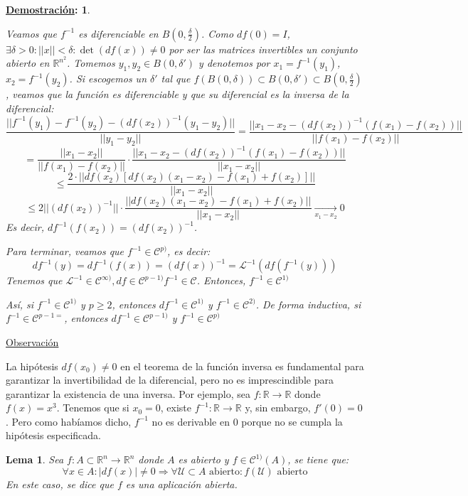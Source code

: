 \documentclass[10pt,a4paper,openright]{book}
\theoremstyle{break}
\newtheorem*{lema}{Lema}
\newtheorem*{demo}{\underline{Demostración}:}
\begin{document}
\begin{demo}
\begin{itemize}
Veamos que $f^{-1}$ es diferenciable en $B(0, \frac{\delta}{2})$. Como $df(0) = I$, $\exists \delta > 0 : || x || < \delta : \det(df(x)) \neq 0$ por ser las matrices invertibles un conjunto abierto en $\mathbb{R}^{n^2}$. Tomemos $y_1, y_2 \in B(0, \delta')$ y denotemos por $x_1 = f^{-1} (y_1)$, $x_2 = f^{-1}(y_2)$. Si escogemos un $\delta'$ tal que $f(B(0, \delta)) \subset B(0, \delta') \subset B(0, \frac{\delta}{2})$, veamos que la función es diferenciable y que su diferencial es la inversa de la diferencial:
$$\frac{||f^{-1}(y_1) - f^{-1}(y_2) - \left( df(x_2) \right)^{-1} (y_1 - y_2) ||}{|| y_1 - y_2 ||} = \frac{|| x_1 - x_2 -  \left( df(x_2) \right)^{-1} (f(x_1) - f(x_2)) ||}{|| f(x_1) - f(x_2) ||}$$
$$= \frac{||x_1 - x_2 || }{|| f(x_1) - f(x_2) ||} \cdot \frac{|| x_1 - x_2 -  \left( df(x_2) \right)^{-1} (f(x_1) - f(x_2)) ||}{|| x_1 - x_2 ||}$$
$$\leq \frac{2 \cdot || df(x_2) [df(x_2) (x_1 - x_2) - f(x_1) + f(x_2)]||}{|| x_1 - x_2 ||}$$
$$\leq 2 ||(df(x_2))^{-1}|| \cdot \frac{|| df(x_2) (x_1 - x_2) - f(x_1) + f(x_2) || }{|| x_1 - x_2 ||} \xrightarrow[x_1- x_2]{} 0$$
Es decir, $df^{-1}(f(x_2)) = (df(x_2))^{-1}$.

Para terminar, veamos que $f^{-1} \in \mathcal{C}^{p)}$, es decir:
$$df^{-1} (y) = df^{-1} (f(x)) = (df(x))^{-1} = \mathcal{L}^{-1} (df(f^{-1}(y)))$$
Tenemos que $\mathcal{L}^{-1} \in \mathcal{C}^{\infty )}, df \in \mathcal{C}^{p-1)} f^{-1} \in \mathcal{C}$. Entonces, $f^{-1} \in \mathcal{C}^{1)}$

Así, si $f^{-1} \in \mathcal{C}^{1)}$ y  $p \geq 2$, entonces $df^{-1} \in \mathcal{C}^{1)}$ y $f^{-1} \in \mathcal{C}^{2)}$. De forma inductiva, si $f^{-1} \in \mathcal{C}^{p-1=}$, entonces $df^{-1} \in \mathcal{C}^{p-1)}$ y $f^{-1} \in \mathcal{C}^{p)}$
\end{itemize}
\end{demo}

\underline{Observación}

La hipótesis $df(x_0) \neq 0$ en el teorema de la función inversa es fundamental para garantizar la invertibilidad de la diferencial, pero 
no es imprescindible para garantizar la existencia de una inversa. Por ejemplo, sea $f:\mathbb{R}\longrightarrow \mathbb{R}$ donde $f(x) = x^3$. Tenemos que  si $x_0 = 0$, existe $f^{-1} : \mathbb{R} \to \mathbb{R}$ y, sin embargo, $f'(0) = 0$. Pero como habíamos dicho, $f^{-1}$ no es derivable en $0$ porque no se cumpla la hipótesis especificada.

\begin{lema}
Sea $f: A \subset \mathbb{R}^n \to \mathbb{R}^n$ donde $A$ es abierto y $f \in \mathcal{C}^{1)}(A)$, se tiene que:
$$\forall x \in A : |df(x)| \neq 0 \Rightarrow \forall \mathcal{U} \subset A \mbox{ abierto}: f(\mathcal{U})\mbox{ abierto}$$
En este caso, se dice que $f$ es una aplicación abierta.
\end{lema}
\end{document}
